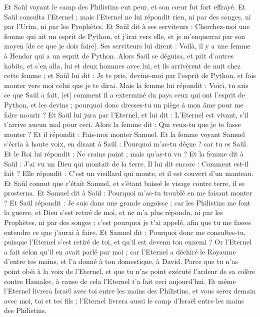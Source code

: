 \begin{multicols}{2}
Et Saül voyant le camp des Philistins eut peur, et son cœur fut fort effrayé.
Et Saül consulta l'Eternel ; mais l'Eternel ne lui répondit rien, ni par des songes, ni par l'Urim, ni par les Prophètes.
Et Saül dit à ses serviteurs : Cherchez-moi une femme qui ait un esprit de Python, et j'irai vers elle, et je m'enquerrai par son moyen [de ce que je dois faire]. Ses serviteurs lui dirent : Voilà, il y a une femme à Hendor qui a un esprit de Python.
Alors Saül se déguisa, et prit d'autres habits, et s'en alla, lui et deux hommes avec lui, et ils arrivèrent de nuit chez cette femme ; et Saül lui dit : Je te prie, devine-moi par l'esprit de Python, et fais monter vers moi celui que je te dirai.
Mais la femme lui répondit : Voici, tu sais ce que Saül a fait, [et] comment il a exterminé du pays ceux qui ont l'esprit de Python, et les devins ; pourquoi donc dresses-tu un piège à mon âme pour me faire mourir ?
Et Saül lui jura par l'Eternel, et lui dit : L'Eternel est vivant, s'il t'arrive aucun mal pour ceci.
Alors la femme dit : Qui veux-tu que je te fasse monter ? Et il répondit : Fais-moi monter Samuel.
Et la femme voyant Samuel s'écria à haute voix, en disant à Saül : Pourquoi m'as-tu déçue ? car tu es Saül.
Et le Roi lui répondit : Ne crains point ; mais qu'as-tu vu ? Et la femme dit à Saül : J'ai vu un Dieu qui montait de la terre.
Il lui dit encore : Comment est-il fait ? Elle répondit : C'est un vieillard qui monte, et il est couvert d'un manteau. Et Saül connut que c'était Samuel, et s'étant baissé le visage contre terre, il se prosterna.
Et Samuel dit à Saül : Pourquoi m'as-tu troublé en me faisant monter ? Et Saül répondit : Je suis dans une grande angoisse ; car les Philistins me font la guerre, et Dieu s'est retiré de moi, et ne m'a plus répondu, ni par les Prophètes, ni par des songes ; c'est pourquoi je t'ai appelé, afin que tu me fasses entendre ce que j'aurai à faire.
Et Samuel dit : Pourquoi donc me consultes-tu, puisque l'Eternel s'est retiré de toi, et qu'il est devenu ton ennemi ?
Or l'Eternel a fait selon qu'il en avait parlé par moi ; car l'Eternel a déchiré le Royaume d'entre tes mains, et l'a donné à ton domestique, à David.
Parce que tu n'as point obéi à la voix de l'Eternel, et que tu n'as point exécuté l'ardeur de sa colère contre Hamalec, à cause de cela l'Eternel t'a fait ceci aujourd'hui.
Et même l'Eternel livrera Israël avec toi entre les mains des Philistins, et vous serez demain avec moi, toi et tes fils ; l'Eternel livrera aussi le camp d'Israël entre les mains des Philistins.

\end{multicols}
